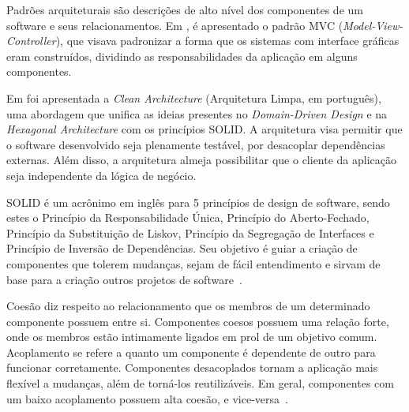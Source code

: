 Padrões arquiteturais são descrições de alto nível dos componentes de um software e seus relacionamentos.
Em \cite{mvc-paper}, é apresentado o padrão MVC (\emph{Model-View-Controller}), que visava padronizar a forma que os sistemas com interface gráficas eram construídos, dividindo as responsabilidades da aplicação em alguns componentes.

Em \cite{clean-arch-book} foi apresentada a \emph{Clean Architecture} (Arquitetura Limpa, em português), uma abordagem que unifica as ideias presentes no \emph{Domain-Driven Design} \cite{ddd-book} e na \emph{Hexagonal Architecture} \cite{hexagonal-arch} com os princípios SOLID.
A arquitetura visa permitir que o software desenvolvido seja plenamente testável, por desacoplar dependências externas.
Além disso, a arquitetura almeja possibilitar que o cliente da aplicação seja independente da lógica de negócio.

SOLID é um acrônimo em inglês para 5 princípios de design de software, sendo estes o Princípio da Responsabilidade Única, Princípio do Aberto-Fechado, Princípio da Substituição de Liskov, Princípio da Segregação de Interfaces e Princípio de Inversão de Dependências.
Seu objetivo é guiar a criação de componentes que tolerem mudanças, sejam de fácil entendimento e sirvam de base para a criação outros projetos de software~\cite{clean-arch-book}.

Coesão diz respeito ao relacionamento que os membros de um determinado componente possuem entre si.
Componentes coesos possuem uma relação forte, onde os membros estão intimamente ligados em prol de um objetivo comum.
Acoplamento se refere a quanto um componente é dependente de outro para funcionar corretamente.
Componentes desacoplados tornam a aplicação mais flexível a mudanças, além de torná-los reutilizáveis.
Em geral, componentes com um baixo acoplamento possuem alta coesão, e vice-versa~\cite{coupling-and-cohesion}.